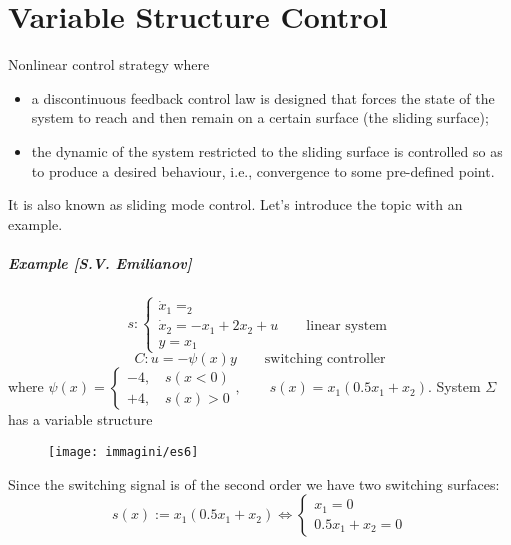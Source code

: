 \chapter{Variable Structure Control}
Nonlinear control strategy where
\begin{itemize}
\item a discontinuous feedback control law is designed that forces the state of the system to reach and then remain on a certain surface (the sliding surface);
\item the dynamic of the system restricted to the sliding surface is controlled so as to produce a desired behaviour, i.e., convergence to some pre-defined point.
\end{itemize}
It is also known as sliding mode control. Let's introduce the topic with an example.
\paragraph{Example [S.V. Emilianov]}
\[
s:\begin{cases}
	\dot{x}_1=_2\\
	\dot{x}_2=-x_1+2x_2+u\qquad \text{linear system}\\
	y=x_1
\end{cases}
\]
\[
C:u=-\psi(x)y\qquad \text{switching controller}
\]where $\psi(x)=\begin{cases}
	-4,\quad s(x<0)\\
	+4,\quad s(x)>0
\end{cases},\qquad s(x)=x_1(0.5x_1+x_2)$.
System $\Sigma$ has a variable structure
\begin{figure}[H]
	\centering
	\texttt{[image: immagini/es6]}
	\caption{}
	\label{fig:es6}
\end{figure}
Since the switching signal is of the second order we have two switching surfaces:
\[
s(x):=x_1(0.5x_1+x_2) \Leftrightarrow \begin{cases}
	x_1=0\\0.5x_1+x_2=0
\end{cases}
\]

